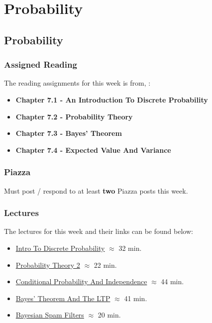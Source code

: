 \clearpage

\renewcommand{\ChapTitle}{Probability}
\renewcommand{\SectionTitle}{Probability}

\chapter{\ChapTitle}
\section{\SectionTitle}

\subsection{Assigned Reading}

The reading assignments for this week is from, \Textbook:

\begin{itemize}
    \item \textbf{Chapter 7.1 - An Introduction To Discrete Probability}
    \item \textbf{Chapter 7.2 - Probability Theory}
    \item \textbf{Chapter 7.3 - Bayes' Theorem}
    \item \textbf{Chapter 7.4 - Expected Value And Variance}
\end{itemize}

\subsection{Piazza}

Must post / respond to at least \textbf{two} Piazza posts this week.

\subsection{Lectures}

The lectures for this week and their links can be found below:

\begin{itemize}
    \item \href{https://applied.cs.colorado.edu/mod/hvp/view.php?id=51840}{Intro To Discrete Probability} $\approx$ 32 min.
    \item \href{https://applied.cs.colorado.edu/mod/hvp/view.php?id=51841}{Probability Theory 2} $\approx$ 22 min.
    \item \href{https://applied.cs.colorado.edu/mod/hvp/view.php?id=51842}{Conditional Probability And Independence} $\approx$ 44 min.
    \item \href{https://applied.cs.colorado.edu/mod/hvp/view.php?id=51843}{Bayes' Theorem And The LTP} $\approx$ 41 min.
    \item \href{https://applied.cs.colorado.edu/mod/hvp/view.php?id=51844}{Bayesian Spam Filters} $\approx$ 20 min.
\end{itemize}

